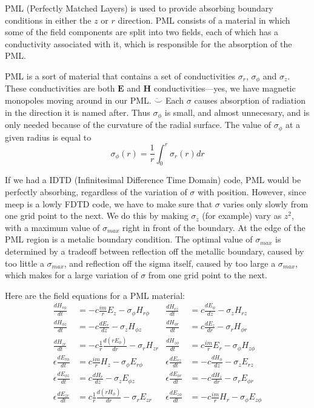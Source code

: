 \documentclass[floats]{book}
\begin{document}
PML (Perfectly Matched Layers) is used to provide absorbing boundary
conditions in either the $z$ or $r$ direction.  PML consists of a material
in which some of the field components are split into two fields, each of
which has a conductivity associated with it, which is responsible for the
absorption of the PML.

PML is a sort of material that contains a set of conductivities $\sigma_r$,
$\sigma_\phi$ and $\sigma_z$.  These conductivities are both $\mathbf{E}$
and $\mathbf{H}$ conductivities---yes, we have magnetic monopoles moving
around in our PML.  $\ddot\smile$ Each $\sigma$ causes absorption of
radiation in the direction it is named after.  Thus $\sigma_\phi$ is small,
and almost unnecesary, and is only needed because of the curvature of the
radial surface.  The value of $\sigma_\phi$ at a given radius is equal to
\begin{equation}
\sigma_\phi(r) = \frac1r \int_0^r \sigma_r(r)dr
\end{equation}

If we had a IDTD (Infinitesimal Difference Time Domain) code, PML would be
perfectly absorbing, regardless of the variation of $\sigma$ with position.
However, since meep is a lowly FDTD code, we have to make sure that
$\sigma$ varies only slowly from one grid point to the next.  We do this by
making $\sigma_z$ (for example) vary as $z^2$, with a maximum value of
$\sigma_{max}$ right in front of the boundary.  At the edge of the PML
region is a metalic boundary condition.  The optimal value of
$\sigma_{max}$ is determined by a tradeoff between reflection off the
metallic boundary, caused by too little a $\sigma_{max}$, and reflection
off the sigma itself, caused by too large a $\sigma_{max}$, which makes for
a large variation of $\sigma$ from one grid point to the next.

Here are the field equations for a PML material:
\begin{align}
\frac{dH_{r\phi}}{dt} &= - c \frac{im}r E_z             - \sigma_\phi H_{r\phi} &
\frac{dH_{rz}}{dt} &= c \frac{dE_\phi}{dz}              - \sigma_z H_{rz}\\
\frac{dH_{\phi z}}{dt} &= - c \frac{dE_r}{dz}           - \sigma_z H_{\phi z} &
\frac{dH_{\phi r}}{dt} &= c \frac{dE_z}{dr}             - \sigma_r H_{\phi r} \\
\frac{dH_{zr}}{dt} &= - c \frac1r\frac{d(rE_\phi)}{dr}  - \sigma_r H_{zr}  &
\frac{dH_{z\phi}}{dt} &= c \frac{im}r E_r               - \sigma_\phi H_{z\phi} \\
\epsilon\frac{dE_{r\phi}}{dt} &=   c \frac{im}r H_z             - \sigma_\phi E_{r\phi} &
\epsilon\frac{dE_{rz}}{dt} &= -c\frac{dH_\phi}{dz}              - \sigma_z E_{rz}\\
\epsilon\frac{dE_{\phi z}}{dt} &=   c \frac{dH_r}{dz}           - \sigma_z E_{\phi z} &
\epsilon\frac{dE_{\phi r}}{dt} &=-c \frac{dH_z}{dr}             - \sigma_r E_{\phi r} \\
\epsilon\frac{dE_{zr}}{dt} &=   c \frac1r\frac{d(rH_\phi)}{dr}  - \sigma_r E_{zr}  &
\epsilon\frac{dE_{z\phi}}{dt} &=-c \frac{im}r H_r               - \sigma_\phi E_{z\phi} 
\end{align}
\end{document}
